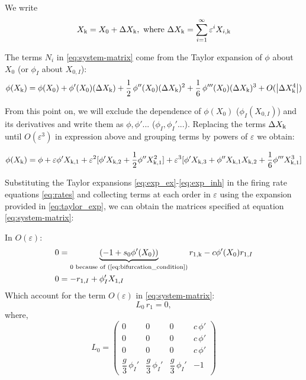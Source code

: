 \documentclass[../main.tex]{subfiles}
\begin{document}
We write
\[
X_{\mathrm{k}} = X_0 + \Delta X_{\mathrm{k}}, \text{ where } \Delta X_{\mathrm{k}} = \sum_{i=1}^\infty\varepsilon^i X_{i,\mathrm{k}}
\]

The terms $N_i$ in \eqref{eq:system-matrix} come from the Taylor expansion of $\phi$ about $X_{0}$ (or $\phi_I$ about $X_{0,I}$):
\begin{equation}
\phi(X_{\mathrm{k}} ) = \phi(X_0) + \phi'(X_0) (\Delta X_{\mathrm{k}} ) + \frac{1}{2}\,\phi''(X_0) (\Delta X_{\mathrm{k}} )^2 +\frac{1}{6}\,\phi'''(X_0) (\Delta X_{\mathrm{k}} )^3+ O(\left|\Delta X_{\mathrm{k}} ^4\right|)
\end{equation}


From this point on, we will exclude the dependence of $\phi(X_0)$ ($\phi_I(X_{0,I})$) and its derivatives and write them as $\phi, \phi'...$ ($\phi_I, \phi_I'...$). Replacing the terms $\Delta X_{\mathrm{k}}$ until $O(\varepsilon^3)$ in expression above and grouping terms by powers of $\varepsilon$ we obtain:

\begin{equation} %
\phi(X_\kk )  = \phi + \varepsilon \phi' X_{\kk ,1} + \varepsilon^2 [\phi' X_{\kk ,2} + \frac12 \phi'' X_{\kk ,1}^2]+ \varepsilon^3 [\phi' X_{\kk ,3} + \phi'' X_{\kk ,1}X_{\kk ,2} +\frac16 \phi''' X_{\kk ,1}^3]
\label{eq:taylor_exp}
\end{equation}
\bigskip 

Substituting the Taylor expansions \eqref{eq:exp_ex}-\eqref{eq:exp_inh} in the firing rate equations \eqref{eq:rates} and collecting terms at each order in $\varepsilon$ using the expansion provided in \eqref{eq:taylor_exp}, we can obtain the matrices specified at equation \eqref{eq:system-matrix}:



In \(O(\varepsilon)\):
\begin{equation}
\begin{aligned}
0 & = \underbrace{(-1+s_{0} \phi'(X_0))}_{0 \text{ because of (\ref{eq:bifurcation_condition})}} r_{1,\mathrm{k} } - c\phi'(X_0)r_{1,I}\\
0 & = -r_{1,I} + \phi_I'X_{1,I}
  \end{aligned}
\end{equation}
Which account for the term $O(\varepsilon)$ in \eqref{eq:system-matrix}:
\begin{equation}
L_0\,r_1 = 0,
\label{eq:o1-matrix}
\end{equation}
where, 
\begin{equation}
  L_0 = \begin{pmatrix}
    0 & 0 & 0 & c\,\phi' \\[2mm]
    0 & 0 & 0 & c\,\phi' \\[2mm]
    0 & 0 & 0 & c\,\phi' \\[2mm]
    \dfrac{g}{3}\,\phi_I' & \dfrac{g}{3}\,\phi_I' & \dfrac{g}{3}\,\phi_I' & -1
  \end{pmatrix}
  \label{eq:L0_matrix}
\end{equation}
\end{document}
